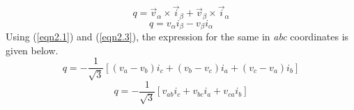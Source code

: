 \begin{equation}
q  =  \stackrel{\rightarrow}{v}_\alpha \times \stackrel{\rightarrow}{i}_\beta + \stackrel{\rightarrow}{v}_\beta \times \stackrel{\rightarrow}{i}_\alpha 
\label{eqn2.3}
\end{equation} \vspace*{-1cm}
\begin{equation}
q  =   v_\alpha i_\beta - v_\beta i_\alpha 
\label{eqn2.4}
\end{equation} \vspace*{1cm}
Using (\ref{eqn2.1}) and (\ref{eqn2.3}), the expression for the same in \textit{abc} coordinates is given below. \vspace*{-1cm}
\begin{equation}
q= -\frac{1}{\sqrt{3}}[(v_a - v_b)i_c + (v_b - v_c)i_a + (v_c - v_a)i_b]
\label{eqn2.5}
\end{equation} \vspace*{-1cm}
\begin{equation}
q= -\frac{1}{\sqrt{3}}[v_{ab}i_c + v_{bc}i_a + v_{ca}i_b]
\label{eqn2.6}
\end{equation}
